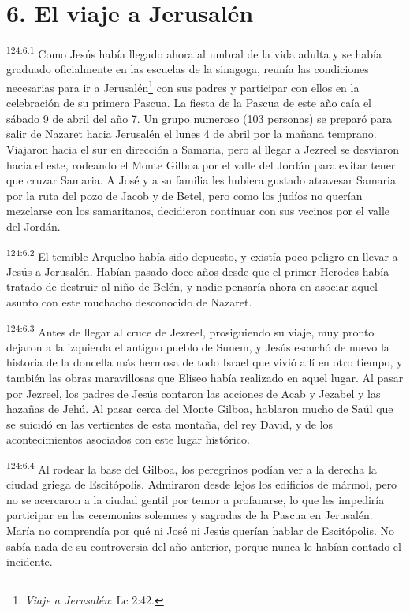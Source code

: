 \section*{6. El viaje a Jerusalén}
\par 
\textsuperscript{124:6.1} Como Jesús había llegado ahora al umbral de la vida adulta y se había graduado oficialmente en las escuelas de la sinagoga, reunía las condiciones necesarias para ir a Jerusalén\footnote{\textit{Viaje a Jerusalén}: Lc 2:42.} con sus padres y participar con ellos en la celebración de su primera Pascua. La fiesta de la Pascua de este año caía el sábado 9 de abril del año 7. Un grupo numeroso (103 personas) se preparó para salir de Nazaret hacia Jerusalén el lunes 4 de abril por la mañana temprano. Viajaron hacia el sur en dirección a Samaria, pero al llegar a Jezreel se desviaron hacia el este, rodeando el Monte Gilboa por el valle del Jordán para evitar tener que cruzar Samaria. A José y a su familia les hubiera gustado atravesar Samaria por la ruta del pozo de Jacob y de Betel, pero como los judíos no querían mezclarse con los samaritanos, decidieron continuar con sus vecinos por el valle del Jordán.

\par 
\textsuperscript{124:6.2} El temible Arquelao había sido depuesto, y existía poco peligro en llevar a Jesús a Jerusalén. Habían pasado doce años desde que el primer Herodes había tratado de destruir al niño de Belén, y nadie pensaría ahora en asociar aquel asunto con este muchacho desconocido de Nazaret.

\par 
\textsuperscript{124:6.3} Antes de llegar al cruce de Jezreel, prosiguiendo su viaje, muy pronto dejaron a la izquierda el antiguo pueblo de Sunem, y Jesús escuchó de nuevo la historia de la doncella más hermosa de todo Israel que vivió allí en otro tiempo, y también las obras maravillosas que Eliseo había realizado en aquel lugar. Al pasar por Jezreel, los padres de Jesús contaron las acciones de Acab y Jezabel y las hazañas de Jehú. Al pasar cerca del Monte Gilboa, hablaron mucho de Saúl que se suicidó en las vertientes de esta montaña, del rey David, y de los acontecimientos asociados con este lugar histórico.

\par 
\textsuperscript{124:6.4} Al rodear la base del Gilboa, los peregrinos podían ver a la derecha la ciudad griega de Escitópolis. Admiraron desde lejos los edificios de mármol, pero no se acercaron a la ciudad gentil por temor a profanarse, lo que les impediría participar en las ceremonias solemnes y sagradas de la Pascua en Jerusalén. María no comprendía por qué ni José ni Jesús querían hablar de Escitópolis. No sabía nada de su controversia del año anterior, porque nunca le habían contado el incidente.

